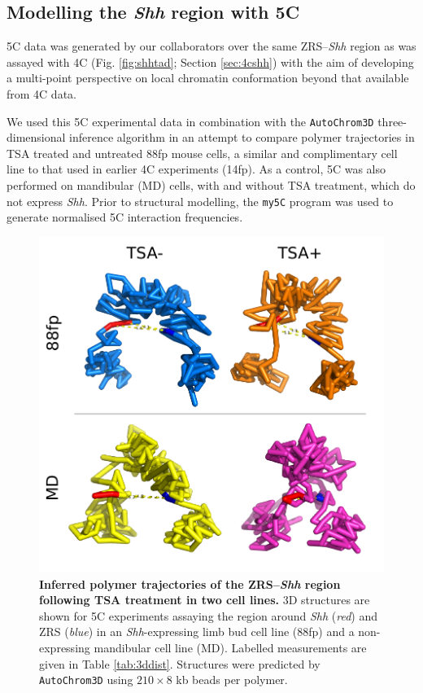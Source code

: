 \documentclass[a4paper,11pt,oneside]{book}
\begin{document}
\subsection{Modelling the \emph{Shh} region with 5C}\label{sec:shh5c}

5C data was generated by our collaborators over the same ZRS--\emph{Shh} region as was assayed with 4C (Fig. \ref{fig:shhtad}; Section \ref{sec:4cshh}) with the aim of developing a multi-point perspective on local chromatin conformation beyond that available from 4C data.

We used this 5C experimental data in combination with the \texttt{AutoChrom3D} three-dimensional inference algorithm\cite{Peng2013} in an attempt to compare polymer trajectories in TSA treated and untreated 88fp mouse cells, a similar and complimentary cell line to that used in earlier 4C experiments (14fp). As a control, 5C was also performed on mandibular (MD) cells, with and without TSA treatment, which do not express \emph{Shh}. Prior to structural modelling, the \texttt{my5C} program was used to generate normalised 5C interaction frequencies.\cite{Lajoie2009a}

\begin{figure}
\begin{center} 
\includegraphics[width=5.45in]{figs/5c3d.pdf}
\captionsetup{width=\textwidth} 
\caption[ Inferred polymer trajectories of the ZRS--\emph{Shh} region following TSA treatment in two cell lines. ]{ {\bf Inferred polymer trajectories of the ZRS--\emph{Shh} region following TSA treatment in two cell lines. }
3D structures are shown for 5C experiments assaying the region around \emph{Shh} (\emph{red}) and ZRS (\emph{blue}) in an \emph{Shh}-expressing limb bud cell line (88fp) and a non-expressing mandibular cell line (MD). Labelled measurements are given in Table \ref{tab:3ddist}. Structures were predicted by \texttt{AutoChrom3D}\cite{Peng2013} using $210 \times 8$ kb beads per polymer.
}\label{fig:5c3d}
\end{center} 
\end{figure} 
\end{document}
